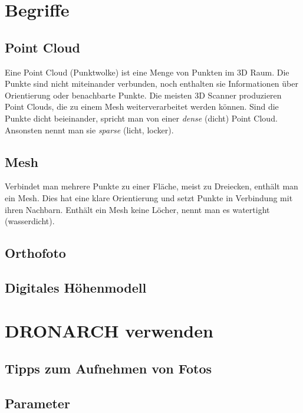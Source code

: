 \chapter{Begriffe}
		\section{Point Cloud}\label{app:point_cloud}
		Eine Point Cloud (Punktwolke) ist eine Menge von Punkten im 3D Raum. Die Punkte sind nicht miteinander verbunden, noch enthalten sie Informationen über Orientierung oder benachbarte Punkte. Die meisten 3D Scanner produzieren Point Clouds, die zu einem Mesh weiterverarbeitet werden können.
		Sind die Punkte dicht beieinander, spricht man von einer \emph{dense} (dicht) Point Cloud. Ansonsten nennt man sie \emph{sparse} (licht, locker).
		
		\section{Mesh}\label{app:mesh}
		Verbindet man mehrere Punkte zu einer Fläche, meist zu Dreiecken, enthält man ein Mesh. Dies hat eine klare Orientierung und setzt Punkte in Verbindung mit ihren Nachbarn. Enthält ein Mesh keine Löcher, nennt man es watertight (wasserdicht).
		
		\section{Orthofoto} \label{app:orthofoto}
		
		\section{Digitales Höhenmodell} \label{app:dtm}

\chapter{DRONARCH verwenden}
	\section{Tipps zum Aufnehmen von Fotos}\label{app:tip_foto}
	\section{Parameter}\label{app:param}